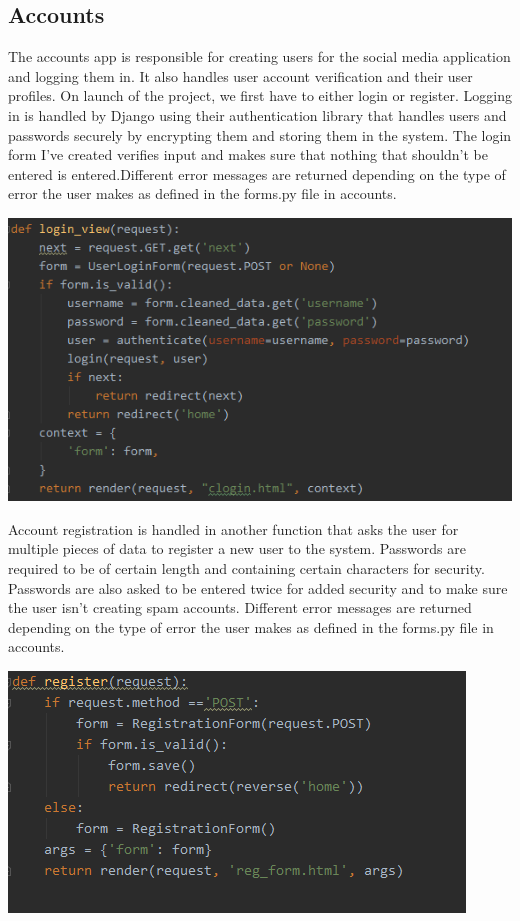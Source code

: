 \documentclass[11pt]{article} %
\begin{document}
\subsection{Accounts}
The accounts app is responsible for creating users for the social media application and logging them in. It also handles user account verification and their user profiles. On launch of the project, we first have to either login or register. Logging in is handled by Django using their authentication library that handles users and passwords securely by encrypting them and storing them in the system. The login form I've created verifies input and makes sure that nothing that shouldn't be entered is entered.Different error messages are returned depending on the type of error the user makes as defined in the forms.py file in accounts.
\begin{center}
\includegraphics{login.png}
\end{center}

Account registration is handled in another function that asks the user for multiple pieces of data to register a new user to the system. Passwords are required to be of certain length and containing certain characters for security. Passwords are also asked to be entered twice for added security and to make sure the user isn't creating spam accounts. Different error messages are returned depending on the type of error the user makes as defined in the forms.py file in accounts.
\begin{center}
\includegraphics{register.png}
\end{center}
\end{document}
